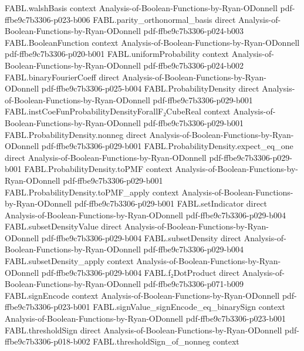 \begin{theorem}
  {FABL.walshBasis}
  {context}
  {Analysis-of-Boolean-Functions-by-Ryan-ODonnell}
  {pdf-ffbe9c7b3306-p023-b006}
\proofstep
  {FABL.parity_orthonormal_basis}
  {direct}
  {Analysis-of-Boolean-Functions-by-Ryan-ODonnell}
  {pdf-ffbe9c7b3306-p024-b003}
\proofstep
  {FABL.BooleanFunction}
  {context}
  {Analysis-of-Boolean-Functions-by-Ryan-ODonnell}
  {pdf-ffbe9c7b3306-p020-b001}
\proofstep
  {FABL.uniformProbability}
  {context}
  {Analysis-of-Boolean-Functions-by-Ryan-ODonnell}
  {pdf-ffbe9c7b3306-p024-b002}
\proofstep
  {FABL.binaryFourierCoeff}
  {direct}
  {Analysis-of-Boolean-Functions-by-Ryan-ODonnell}
  {pdf-ffbe9c7b3306-p025-b004}
\proofstep
  {FABL.ProbabilityDensity}
  {direct}
  {Analysis-of-Boolean-Functions-by-Ryan-ODonnell}
  {pdf-ffbe9c7b3306-p029-b001}
\proofstep
  {FABL.instCoeFunProbabilityDensityForallF₂CubeReal}
  {context}
  {Analysis-of-Boolean-Functions-by-Ryan-ODonnell}
  {pdf-ffbe9c7b3306-p029-b001}
\proofstep
  {FABL.ProbabilityDensity.nonneg}
  {direct}
  {Analysis-of-Boolean-Functions-by-Ryan-ODonnell}
  {pdf-ffbe9c7b3306-p029-b001}
\proofstep
  {FABL.ProbabilityDensity.expect_eq_one}
  {direct}
  {Analysis-of-Boolean-Functions-by-Ryan-ODonnell}
  {pdf-ffbe9c7b3306-p029-b001}
\proofstep
  {FABL.ProbabilityDensity.toPMF}
  {context}
  {Analysis-of-Boolean-Functions-by-Ryan-ODonnell}
  {pdf-ffbe9c7b3306-p029-b001}
\proofstep
  {FABL.ProbabilityDensity.toPMF_apply}
  {context}
  {Analysis-of-Boolean-Functions-by-Ryan-ODonnell}
  {pdf-ffbe9c7b3306-p029-b001}
\proofstep
  {FABL.setIndicator}
  {direct}
  {Analysis-of-Boolean-Functions-by-Ryan-ODonnell}
  {pdf-ffbe9c7b3306-p029-b004}
\proofstep
  {FABL.subsetDensityValue}
  {direct}
  {Analysis-of-Boolean-Functions-by-Ryan-ODonnell}
  {pdf-ffbe9c7b3306-p029-b004}
\proofstep
  {FABL.subsetDensity}
  {direct}
  {Analysis-of-Boolean-Functions-by-Ryan-ODonnell}
  {pdf-ffbe9c7b3306-p029-b004}
\proofstep
  {FABL.subsetDensity_apply}
  {context}
  {Analysis-of-Boolean-Functions-by-Ryan-ODonnell}
  {pdf-ffbe9c7b3306-p029-b004}
\proofstep
  {FABL.f₂DotProduct}
  {direct}
  {Analysis-of-Boolean-Functions-by-Ryan-ODonnell}
  {pdf-ffbe9c7b3306-p071-b009}
\proofstep
  {FABL.signEncode}
  {context}
  {Analysis-of-Boolean-Functions-by-Ryan-ODonnell}
  {pdf-ffbe9c7b3306-p023-b001}
\proofstep
  {FABL.signValue_signEncode_eq_binarySign}
  {context}
  {Analysis-of-Boolean-Functions-by-Ryan-ODonnell}
  {pdf-ffbe9c7b3306-p023-b001}
\proofstep
  {FABL.thresholdSign}
  {direct}
  {Analysis-of-Boolean-Functions-by-Ryan-ODonnell}
  {pdf-ffbe9c7b3306-p018-b002}
\proofstep
  {FABL.thresholdSign_of_nonneg}
  {context}

\end{theorem}
